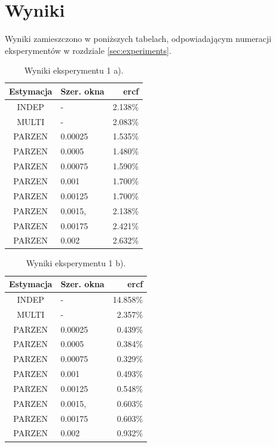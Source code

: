 \documentclass{article}
\begin{document}
	\section{Wyniki} \label{sec:results}
	
	Wyniki zamieszczono w poniższych tabelach, odpowiadającym numeracji eksperymentów w rozdziale \ref{sec:experiments}. 
	
	\begin{table}[H] \centering
		\begin{tabular}{c|l|r}
			Estymacja & Szer. okna & ercf \\ \hline
			INDEP  & -       & 2.138\% \\ 
			MULTI  & -       & 2.083\% \\ 
			PARZEN & 0.00025 & 1.535\% \\ 
			PARZEN & 0.0005  & 1.480\% \\
			PARZEN & 0.00075 & 1.590\% \\
			PARZEN & 0.001   & 1.700\% \\ 
			PARZEN & 0.00125 & 1.700\% \\ 
			PARZEN & 0.0015, & 2.138\% \\ 
			PARZEN & 0.00175 & 2.421\% \\ 
			PARZEN & 0.002   & 2.632\%
		\end{tabular}
	\caption{Wyniki eksperymentu 1 a). }
	\label{tab:1a}
	\end{table}

	\begin{table}[H] \centering
		\begin{tabular}{c|l|r}
			Estymacja & Szer. okna & ercf \\ \hline
			INDEP  & -       & 14.858\% \\ 
			MULTI  & -       & 2.357\% \\ 
			PARZEN & 0.00025 & 0.439\% \\ 
			PARZEN & 0.0005  & 0.384\% \\
			PARZEN & 0.00075 & 0.329\% \\
			PARZEN & 0.001   & 0.493\% \\ 
			PARZEN & 0.00125 & 0.548\% \\ 
			PARZEN & 0.0015, & 0.603\% \\ 
			PARZEN & 0.00175 & 0.603\% \\ 
			PARZEN & 0.002   & 0.932\%
		\end{tabular}
		\caption{Wyniki eksperymentu 1 b). }
		\label{tab:1b}
	\end{table}
\end{document}
